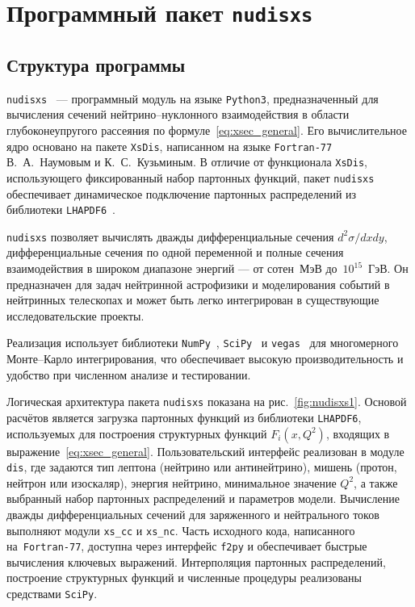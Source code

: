 \section{Программный пакет \texttt{nudisxs}}
\subsection{Структура программы}
\texttt{nudisxs}~\cite{nudisxs2022} — программный модуль на языке \texttt{Python3}, предназначенный для вычисления сечений нейтрино–нуклонного взаимодействия в области глубоконеупругого рассеяния по формуле~\eqref{eq:xsec_general}. 
Его вычислительное ядро основано на пакете \texttt{XsDis}, написанном на языке \texttt{Fortran-77} В.~А.~Наумовым и К.~С.~Кузьминым. 
В отличие от функционала \texttt{XsDis}, использующего фиксированный набор партонных функций, пакет \texttt{nudisxs} обеспечивает динамическое подключение партонных распределений из библиотеки \texttt{LHAPDF6}~\cite{aartsenLHAPDF2020}.

\texttt{nudisxs} позволяет вычислять дважды дифференциальные сечения $d^2\sigma/dx dy$, дифференциальные сечения по одной переменной и полные сечения взаимодействия в широком диапазоне энергий — от сотен~МэВ до~$10^{15}$~ГэВ. 
Он предназначен для задач нейтринной астрофизики и моделирования событий в нейтринных телескопах и может быть легко интегрирован в существующие исследовательские проекты.

Реализация использует библиотеки \texttt{NumPy}~\cite{2020NumPy-Array}, \texttt{SciPy}~\cite{2020SciPy-NMeth} и \texttt{vegas}~\cite{lepageVegas2021} для многомерного Монте–Карло интегрирования, что обеспечивает высокую производительность и удобство при численном анализе и тестировании. 
%

Логическая архитектура пакета \texttt{nudisxs} показана на рис.~\ref{fig:nudisxs1}. 
Основой расчётов является загрузка партонных функций из библиотеки \texttt{LHAPDF6}, используемых для построения структурных функций $F_i(x, Q^2)$, входящих в выражение~\eqref{eq:xsec_general}. 
Пользовательский интерфейс реализован в модуле \texttt{dis}, где задаются тип лептона (нейтрино или антинейтрино), мишень (протон, нейтрон или изоскаляр), энергия нейтрино, минимальное значение $Q^2$, а также выбранный набор партонных распределений и параметров модели. 
Вычисление дважды дифференциальных сечений для заряженного и нейтрального токов выполняют модули \texttt{xs\_cc} и \texttt{xs\_nc}. 
Часть исходного кода, написанного на~\texttt{Fortran-77}, доступна через интерфейс \texttt{f2py} и обеспечивает быстрые вычисления ключевых выражений. 
Интерполяция партонных распределений, построение структурных функций и численные процедуры реализованы средствами \texttt{SciPy}.

